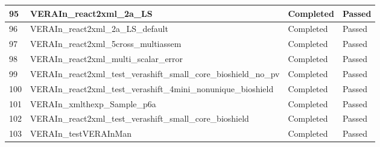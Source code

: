 \begin{longtable}[!ht]{|p{0.75cm}|p{11.25cm}|p{1.6cm}|p{1.1cm}|}
\rowcolor{caslcolor1}\small 95 & \small VERAIn\_react2xml\_2a\_LS & \small Completed & \small Passed \\\hline
\rowcolor{caslcolor2}\small 96 & \small VERAIn\_react2xml\_2a\_LS\_default & \small Completed & \small Passed \\\hline
\rowcolor{caslcolor1}\small 97 & \small VERAIn\_react2xml\_5cross\_multiassem & \small Completed & \small Passed \\\hline
\rowcolor{caslcolor2}\small 98 & \small VERAIn\_react2xml\_multi\_scalar\_error & \small Completed & \small Passed \\\hline
\rowcolor{caslcolor1}\small 99 & \small VERAIn\_react2xml\_test\_verashift\_small\_core\_bioshield\_no\_pv & \small Completed & \small Passed \\\hline
\rowcolor{caslcolor2}\small 100 & \small VERAIn\_react2xml\_test\_verashift\_4mini\_nonunique\_bioshield & \small Completed & \small Passed \\\hline
\rowcolor{caslcolor1}\small 101 & \small VERAIn\_xmlthexp\_Sample\_p6a & \small Completed & \small Passed \\\hline
\rowcolor{caslcolor2}\small 102 & \small VERAIn\_react2xml\_test\_verashift\_small\_core\_bioshield & \small Completed & \small Passed \\\hline
\rowcolor{caslcolor1}\small 103 & \small VERAIn\_testVERAInMan & \small Completed & \small Passed \\\hline



\end{longtable}
